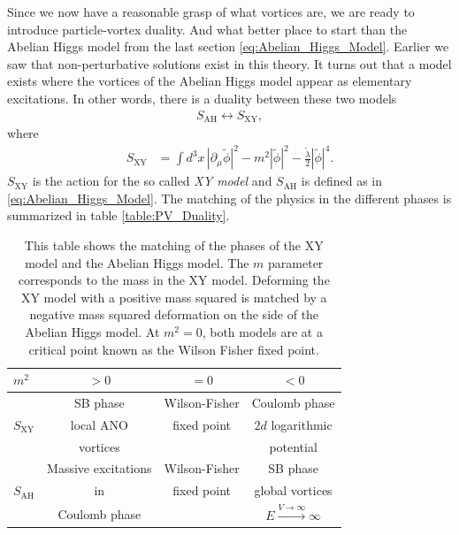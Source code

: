     Since we now have a reasonable grasp of what vortices are, we are ready to introduce particle-vortex duality. And what better place to start than the Abelian Higgs model from the last section \eqref{eq:Abelian_Higgs_Model}. Earlier we saw that non-perturbative solutions exist in this theory. It turns out that a model exists where the vortices of the Abelian Higgs model appear as elementary excitations. In other words, there is a duality between these two models
    \begin{align}
        S_{\text{AH}} \longleftrightarrow S_{\text{XY}},
    \end{align}
    where
    \begin{align}
        S_{\text{XY}} &= \int d^3x \, |\partial_{\mu}\tilde{\phi}|^2-m^2 |\tilde{\phi}|^2 - \frac{\tilde{\lambda}}{2} |\tilde{\phi}|^4.
    \end{align}
    $S_{\text{XY}}$ is the action for the so called \textit{XY model} and $S_{\text{AH}}$ is defined as in \eqref{eq:Abelian_Higgs_Model}. The matching of the physics in the different phases is summarized in table \eqref{table:PV_Duality}.
    \begin{table}
\begin{center}
  \begin{tabular}{| l | c | c | c|}
      \hline
    $m^2$           &  $>0$                  & $=0$                           &  $<0$                                               \\\hline
                    &  SB phase              & Wilson-Fisher &  Coulomb phase                                      \\                             
    $S_{\text{XY}}$ &  local ANO             &  fixed point                   &  $2d$ logarithmic                                   \\                           
                    &  vortices              &                                &  potential                                          \\\hline
                    &   Massive excitations  & Wilson-Fisher &  SB phase                                           \\                
    $S_{\text{AH}}$ &  in                    & fixed point                    &  global vortices                                    \\                                  
                    &  Coulomb phase         &                                &  $E\xrightarrow{V \rightarrow \infty} \infty$       \\                      
    \hline
  \end{tabular}
\end{center}
        \caption[This table shows the matching of the phases of the XY model and the Abelian Higgs model.]{This table shows the matching of the phases of the XY model and the Abelian Higgs model. The $m$ parameter corresponds to the mass in the XY model. Deforming the XY model with a positive mass squared is matched by a negative mass squared deformation on the side of the Abelian Higgs model. At $m^2=0$, both models are at a critical point known as the Wilson Fisher fixed point. }
        \label{table:PV_Duality}
    \end{table}

